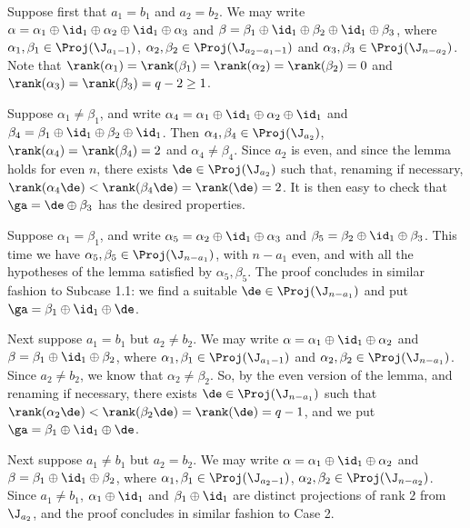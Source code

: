 \bigskip{}  Suppose first that $a_1=b_1$ and $a_2=b_2$.  We may write $\alpha=\alpha_1\oplus\id_1\oplus\alpha_2\oplus\id_1\oplus\alpha_3$ and $\beta=\beta_1\oplus\id_1\oplus\beta_2\oplus\id_1\oplus\beta_3$, where $\alpha_1,\beta_1\in\Proj(\J_{a_1-1})$, $\alpha_2,\beta_2\in\Proj(\J_{a_2-a_1-1})$ and $\alpha_3,\beta_3\in\Proj(\J_{n-a_2})$.
%
Note that $\rank(\alpha_1)=\rank(\beta_1)=\rank(\alpha_2)=\rank(\beta_2)=0$ and $\rank(\alpha_3)=\rank(\beta_3)=q-2\geq1$.

\bigskip{}  Suppose $\alpha_1\not=\beta_1$, and write $\alpha_4=\alpha_1\oplus\id_1\oplus\alpha_2\oplus\id_1$ and $\beta_4=\beta_1\oplus\id_1\oplus\beta_2\oplus\id_1$.  Then $\alpha_4,\beta_4\in\Proj(\J_{a_2})$, $\rank(\alpha_4)=\rank(\beta_4)=2$ and $\alpha_4\not=\beta_4$.  Since $a_2$ is even, and since the lemma holds for even $n$, there exists $\de\in\Proj(\J_{a_2})$ such that, renaming if necessary, $\rank(\alpha_4\de)<\rank(\beta_4\de)=\rank(\de)=2$.  It is then easy to check that $\ga=\de\oplus\beta_3$ has the desired properties.

\bigskip{}  Suppose $\alpha_1=\beta_1$, and write $\alpha_5=\alpha_2\oplus\id_1\oplus\alpha_3$ and $\beta_5=\beta_2\oplus\id_1\oplus\beta_3$.  This time we have $\alpha_5,\beta_5\in\Proj(\J_{n-a_1})$, with $n-a_1$ even, and with all the hypotheses of the lemma satisfied by $\alpha_5,\beta_5$.  The proof concludes in similar fashion to Subcase 1.1: we find a suitable $\de\in\Proj(\J_{n-a_1})$ and put $\ga=\beta_1\oplus\id_1\oplus\de$.

\bigskip{}  Next suppose $a_1=b_1$ but $a_2\not=b_2$.  We may write $\alpha=\alpha_1\oplus\id_1\oplus\alpha_2$ and $\beta=\beta_1\oplus\id_1\oplus\beta_2$, where $\alpha_1,\beta_1\in\Proj(\J_{a_1-1})$ and $\alpha_2,\beta_2\in\Proj(\J_{n-a_1})$.  Since $a_2\not=b_2$, we know that $\alpha_2\not=\beta_2$.  So, by the even version of the lemma, and renaming if necessary, there exists $\de\in\Proj(\J_{n-a_1})$ such that $\rank(\alpha_2\de)<\rank(\beta_2\de)=\rank(\de)=q-1$, and we put $\ga=\beta_1\oplus\id_1\oplus\de$.



\bigskip{} Next suppose $a_1\not=b_1$ but $a_2=b_2$.  We may write $\alpha=\alpha_1\oplus\id_1\oplus\alpha_2$ and $\beta=\beta_1\oplus\id_1\oplus\beta_2$, where $\alpha_1,\beta_1\in\Proj(\J_{a_2-1})$, $\alpha_2,\beta_2\in\Proj(\J_{n-a_2})$.  Since $a_1\not=b_1$, $\alpha_1\oplus\id_1$ and $\beta_1\oplus\id_1$ are distinct projections of rank $2$ from $\J_{a_2}$, and the proof concludes in similar fashion to Case 2.





